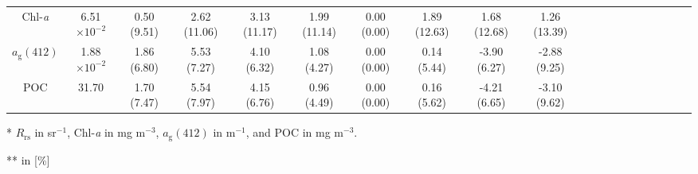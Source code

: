 \documentclass[preview]{standalone}
\begin{document}
\begin{threeparttable}
\begin{tabular}{@{\extracolsep{4pt}}Sc ccccccccc ccccccccc@{}}
Chl-\it{a}    	& 6.51$\times10^{-2}$ &   0.50 (9.51) & 2.62 (11.06)& 3.13 (11.17)& 1.99 (11.14)& 0.00 (0.00) & 1.89 (12.63)& 1.68 (12.68)& 1.26 (13.39) 						\\ 
$a_\text{g}(412)$  	& 1.88$\times10^{-2}$ &    1.86 (6.80)& 5.53 (7.27)& 4.10 (6.32)& 1.08 (4.27)& 0.00 (0.00)& 0.14 (5.44)& -3.90 (6.27)& -2.88  (9.25)					\\ 
POC	       	&  31.70 				&    1.70 (7.47)& 5.54 (7.97)& 4.15 (6.76)& 0.96 (4.49)& 0.00 (0.00)& 0.16 (5.62)& -4.21 (6.65)& -3.10 (9.62) 					\\ \hline


\end{tabular}
\begin{tablenotes}\footnotesize
\item [*] $R_\text{rs}$ in sr$^{-1}$, Chl-{\it a} in mg m$^{-3}$, $a_\text{g}(412)$ in m$^{-1}$, and POC in mg m$^{-3}$.
\item [**] in [\%]
\end{tablenotes}
\end{threeparttable}
\end{document}
